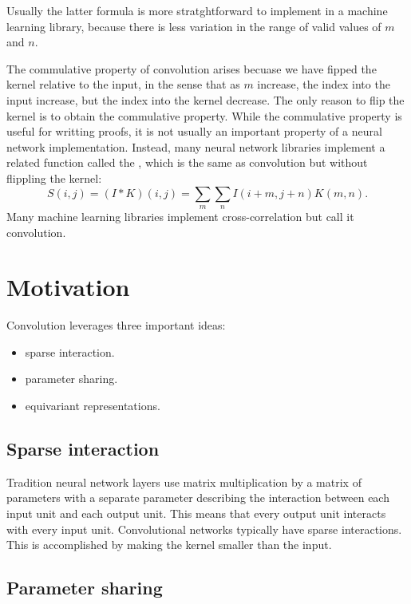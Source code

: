 Usually the latter formula is more stratghtforward to implement in a machine learning library, because there is less variation in the range of valid values of $m$ and $n$.


The commulative property of convolution arises becuase we have fipped the kernel relative to the input, in the sense that as $m$ increase, the index into the input increase, but the index into the kernel decrease.
The only reason to flip the kernel is to obtain the commulative property.
While the commulative property is useful for writting proofs, it is not usually an important property of a neural network implementation.
Instead, many neural network libraries implement a related function called the , which is the same as convolution but without flippling the kernel:
\begin{equation}
  S(i,j) = (I*K)(i,j) = \sum_m\sum_nI(i+m,j+n)K(m,n).
\end{equation}
Many machine learning libraries implement cross-correlation but call it convolution.


\section{Motivation}

Convolution leverages three important ideas:
\begin{itemize}
\item sparse interaction.
\item parameter sharing.
\item equivariant representations.
\end{itemize}

\subsection{Sparse interaction}

Tradition neural network layers use matrix multiplication by a matrix of parameters with a separate parameter describing the interaction between each input unit and each output unit.
This means that every output unit interacts with every input unit.
Convolutional networks typically have sparse interactions.
This is accomplished by making the kernel smaller than the input.


\subsection{Parameter sharing}

